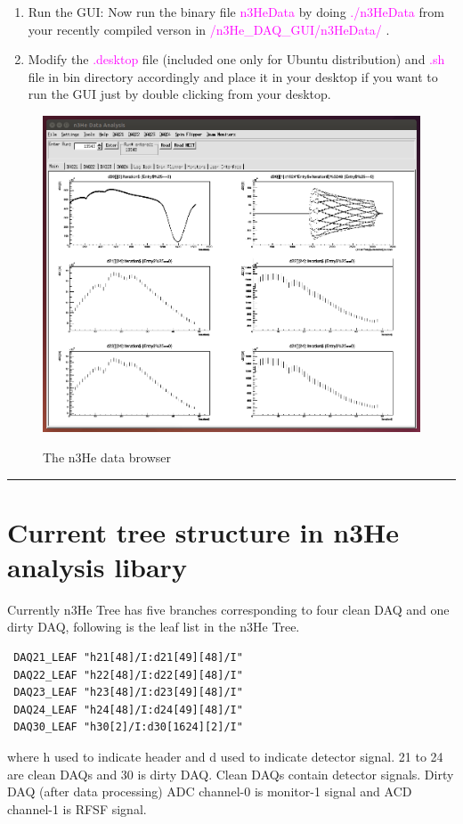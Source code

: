 \documentclass[12pt]{article}
\begin{document}
\begin{enumerate}
\item Run the GUI:
Now run the binary file \textcolor{magenta}{n3HeData} by doing \textcolor{magenta}{./n3HeData} from your recently compiled verson in \textcolor{magenta}{\*/n3He\_DAQ\_GUI/n3HeData/} .

\item Modify the \textcolor{magenta}{.desktop} file (included one only for Ubuntu distribution) and \textcolor{magenta}{.sh} file in bin directory accordingly and place it in your desktop if you want to run the GUI just by double clicking from your desktop.

\end{enumerate}

\begin{figure}[htb]
\centering
\includegraphics[width=6in]{data_browser.png}\\
\caption{The n3He data browser}\label{f2}
\end{figure}

\noindent
{\color{red} \rule{\linewidth}{1mm} }
 
\newpage
\section{Current tree structure in n3He analysis libary}

Currently n3He Tree has five branches corresponding to four clean DAQ and one dirty DAQ, following is the leaf list in the n3He Tree. 
\begin{lstlisting}
 DAQ21_LEAF "h21[48]/I:d21[49][48]/I"
 DAQ22_LEAF "h22[48]/I:d22[49][48]/I"
 DAQ23_LEAF "h23[48]/I:d23[49][48]/I"
 DAQ24_LEAF "h24[48]/I:d24[49][48]/I"
 DAQ30_LEAF "h30[2]/I:d30[1624][2]/I"
\end{lstlisting}
where h used to indicate header and d used to indicate detector signal. 21 to 24 are clean DAQs and 30 is dirty DAQ. Clean DAQs contain detector signals. Dirty DAQ (after data processing) ADC channel-0 is monitor-1 signal and ACD channel-1 is RFSF signal. 
\end{document}
